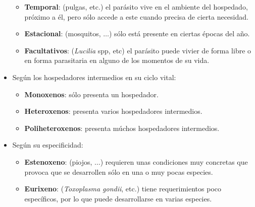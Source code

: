 \documentclass[10pt,a4paper,onecolumn,openany]{book}
\begin{document}
\begin{itemize}[itemsep=0pt,parsep=0pt,topsep=0pt,partopsep=0pt]
\begin{itemize}[itemsep=0pt,parsep=0pt,topsep=0pt,partopsep=0pt]
		\item\textbf{Temporal}: (pulgas, etc.) el parásito vive en el ambiente del hospedado, próximo a él, pero sólo accede a este cuando precisa de cierta necesidad.
		\item\textbf{Estacional}: (mosquitos, $\dots$) sólo está presente en ciertas épocas del año.
		\item\textbf{Facultativos}: (\textit{Lucilia} spp, etc) el parásito puede vivier de forma libre o en forma parasitaria en alguno de los momentos de su vida.
	\end{itemize}
	\item Según los hospedadores intermedios en su ciclo vital:
	\begin{itemize}[itemsep=0pt,parsep=0pt,topsep=0pt,partopsep=0pt]
		\item \textbf{Monoxenos}: sólo presenta un hospedador.
		\item\textbf{Heteroxenos}: presenta varios hospedadores intermedios.
		\item\textbf{Poliheteroxenos}: presenta múchos hospedadores intermedios.
	\end{itemize}
	\item Según su especificidad:
	\begin{itemize}[itemsep=0pt,parsep=0pt,topsep=0pt,partopsep=0pt]
		\item \textbf{Estenoxeno}: (piojos, $\dots$) requieren unas condiciones muy concretas que provoca que se desarrollen sólo en una o muy pocas especies.
		\item\textbf{Eurixeno}: (\textit{Toxoplasma gondii}, etc.) tiene requerimientos poco específicos, por lo que puede desarrollarse en varias especies.
	\end{itemize}
\end{itemize}
\end{document}
